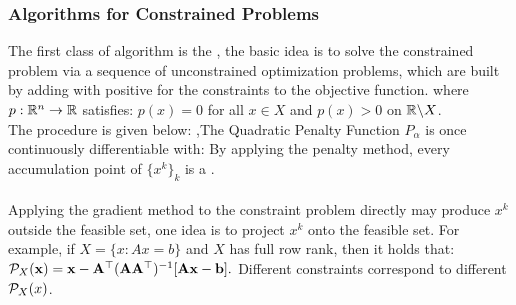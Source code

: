 \documentclass[12pt]{report}
\begin{document}
\subsubsection{Algorithms for Constrained Problems}
The first class of algorithm is the , the basic idea is to solve the constrained
problem via a sequence of unconstrained optimization problems, which are built by adding 
with positive  for the constraints to the objective function.
where $p:\RR^n\to\RR$ satisfies: $p(x)=0$ for all $x\in X$ and $p(x)>0$ on $\RR \backslash X$.\\
The procedure is given below:
\sep{The Quadratic Penalty Function}
$P_\alpha$ is once continuously differentiable with:
By applying the penalty method, every accumulation point of $\{x^k\}_k$ is a .\\
\\
Applying the gradient method to the constraint problem directly may produce $x^k$ outside the feasible set, one idea is
to project $x^k$ onto the feasible set.
For example, if $X=\{x:Ax=b\}$ and $X$ has full row rank, then it holds that:
$\mathcal{P}_X(\mathbf{x})=\mathbf{x}-\mathbf{A}^\top(\mathbf{A}\mathbf{A}^\top)^{-1}[\mathbf{A}\mathbf{x}-\mathbf{b}].$
Different constraints correspond to different $\mathcal{P}_X(x)$.
\end{document}
